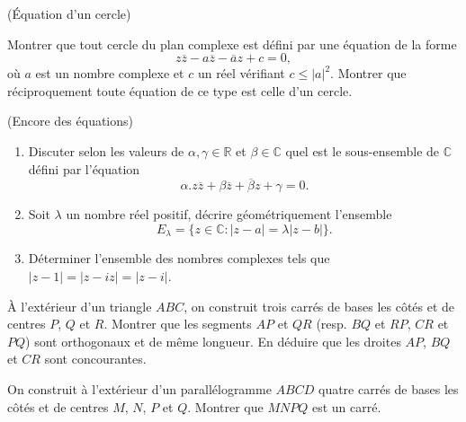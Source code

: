 \documentclass[a4paper,12pt,reqno]{amsart}
\begin{document}
\begin{exo} (Équation d'un cercle)

  Montrer que tout cercle du plan complexe est défini par une équation de la forme
    $$
      z\overline{z}-a\overline{z}-\overline{a}z+c=0,
    $$
  où $a$ est un nombre complexe et $c$ un réel vérifiant $c \leq |a|^{2}$. Montrer que réciproquement toute équation de ce type est celle d'un cercle.
\end{exo}

\begin{exo} (Encore des équations)
  \begin{enumerate}
    \item Discuter selon les valeurs de $\alpha,\gamma \in \mathbb{R}$ et $\beta \in \mathbb{C}$ quel est le sous-ensemble de $\mathbb{C}$ défini par l'équation
      $$
        \alpha.z\overline{z}+\beta\overline{z}+\overline{\beta}z+\gamma=0.
      $$
    \item Soit $\lambda$ un nombre réel positif, décrire géométriquement l'ensemble
      $$
        E_{\lambda}=\lbrace z\in\mathbb{C}:\vert z-a \vert =\lambda \vert z-b \vert \rbrace .
      $$
    \item Déterminer l'ensemble des nombres complexes tels que $\vert z-1 \vert=\vert z-i z\vert=\vert z-i \vert$.
  \end{enumerate}
\end{exo}

\begin{exo}


  À l'extérieur d'un triangle $ABC$, on construit trois carrés de bases les côtés et de centres $P$, $Q$ et $R$. Montrer que les segments $AP$ et $QR$ (resp. $BQ$ et $RP$, $CR$ et $PQ$) sont orthogonaux et de même longueur. En déduire que les droites $AP$, $BQ$ et $CR$ sont concourantes.
\end{exo}

\begin{exo}


  On construit à l'extérieur d'un parallélogramme $ABCD$ quatre carrés de bases les côtés et de centres $M$, $N$, $P$ et $Q$. Montrer que $MNPQ$ est un carré.
\end{exo}
\end{document}
